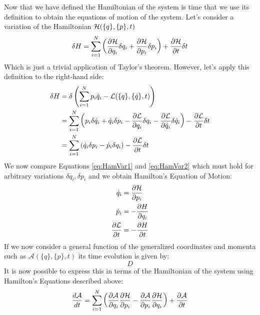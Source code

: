 \vspace{1mm}\noindent Now that we have defined the Hamiltonian of the system is time that we use its definition to obtain the equations of motion of the system. Let's consider a variation of the Hamiltonian $\mathcal{H}(\{q\},\{p\},t)$
\begin{equation}
    \delta H =\sum_{i=1}^N \left(\frac{\partial \mathcal{H}}{\partial q_i}\delta q_i + \frac{\partial \mathcal{H}}{\partial p_i}\delta p_i\right) + \frac{\partial \mathcal{H}}{\partial t}\delta t  
    \label{eq:HamVar1}
\end{equation}
Which is just a trivial application of Taylor's theorem. However, let's apply this definition to the right-hand side:
\begin{align}
     \delta H &= \delta\left( \sum_{i=1}^{N} p_i \dot q_i - \mathcal{L}(\{q\},\{\dot q\},t)\right)\\
     &= \sum_{i=1}^{N} \left( p_i \delta \dot q_i + \dot q_i \delta p_i - \frac{\partial\mathcal{L}}{\partial q_i}\delta q_i - \frac{\partial\mathcal{L}}{\partial \dot q_i} \delta \dot q_i\right) - \frac{\partial \mathcal{L}}{\partial t}\delta t\\
      &=\sum_{i=1}^{N} \left(  \dot q_i \delta p_i - \dot p_i \delta  q_i\right) - \frac{\partial \mathcal{L}}{\partial t}\delta t
      \label{eq:HamVar2}
\end{align}
We now compare Equations \ref{eq:HamVar1} and \ref{eq:HamVar2} which must hold for arbitrary variations $\delta q_i,\delta p_i$ and we obtain Hamilton's Equation of Motion:
\begin{align}
    \dot q_i &= \frac{\partial \mathcal{H}}{\partial p_i}\\
    \dot p_i &= -\frac{\partial H}{\partial q_i}\\
    \frac{\partial \mathcal{L}}{\partial t} &= -\frac{\partial H}{\partial t}
\end{align}
If we now consider a general function of the generalized coordinates and momenta such as $\mathcal{A}(\{q\},\{p\},t)$ its time evolution is given by:
\begin{equation}
    D
    \label{eq:TimeEvClassical}
\end{equation}
It is now possible to express this in terms of the Hamiltonian of the system using Hamilton's Equations described above:
\begin{equation}
    \frac{d\mathcal{A}}{dt} = \sum_{i=1}^N \left(\frac{\partial\mathcal{A}}{\partial q_i}\frac{\partial \mathcal{H}}{\partial p_i} - \frac{\partial\mathcal{A}}{\partial p_i}\frac{\partial \mathcal{H}}{\partial q_i}\right) +\frac{\partial \mathcal{A}}{\partial t}
\end{equation}
